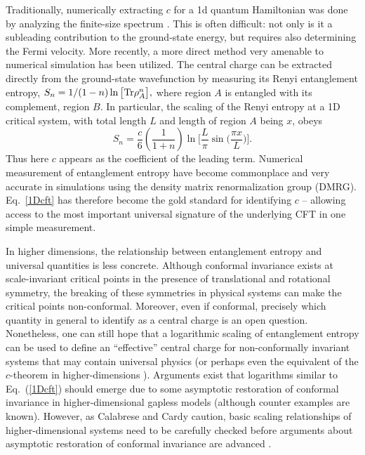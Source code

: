 \documentclass[prl,aps,twocolumn,floatfix,amsmath,amssymb,superscriptaddress,tightenlines]{revtex4}
\begin{document}
Traditionally, numerically extracting $c$ for a 1d quantum
Hamiltonian was done by analyzing the finite-size spectrum
\cite{BCN,Affleck}.  This is often difficult: not only is it a
subleading contribution to the ground-state energy, but requires also
determining the Fermi velocity.
More recently, a more direct method very amenable to numerical
simulation has been utilized.  The central charge can be extracted
directly from the ground-state wavefunction by measuring its Renyi
entanglement entropy, $ S_n = 1/(1-n) \ln \big[ {\rm Tr} \rho_A^n
\big], $ where region $A$ is entangled with its complement, region
$B$.  In particular, the scaling of the Renyi entropy at a 1D critical system,
with total length $L$ and length of region $A$ being $x$, obeys \cite{Korepin,Cardy}
\begin{equation}
S_n = \frac{c}{6}\left({ \frac{1}{1+n} }\right) \ln\Big[ \frac{L}{\pi} \sin\big( \frac{\pi x}{L} \big) \Big]. \label{1Dcft}
\end{equation}
Thus here $c$ appears as the coefficient of the leading
term.  
Numerical measurement of entanglement entropy have become commonplace and 
very accurate in simulations using the density matrix renormalization group (DMRG).
Eq.~\ref{1Dcft} has therefore become the gold standard for identifying
$c$ -- allowing access to the most important universal signature of
the underlying CFT in one simple measurement.



In higher dimensions, the relationship between entanglement entropy
and universal quantities is less concrete.  Although conformal
invariance exists at scale-invariant critical points in the presence
of translational and rotational symmetry, the breaking of these
symmetries in physical systems can make the critical points
non-conformal.  Moreover, even if conformal, precisely which quantity
in general to identify as a central charge is an open question.
Nonetheless, one can still hope that a logarithmic scaling of
entanglement entropy can be used to define an ``effective'' central
charge for non-conformally invariant systems that may contain
universal physics (or perhaps even the equivalent of the $c$-theorem
in higher-dimensions \cite{ryu,Myers}).  Arguments exist that
logarithms similar to Eq.~(\ref{1Dcft}) should emerge due to some
asymptotic restoration of conformal invariance in higher-dimensional
gapless models \cite{Shredder} (although counter examples are known).  However, as
Calabrese and Cardy caution, basic scaling relationships of
higher-dimensional systems need to be carefully checked before
arguments about asymptotic restoration of conformal invariance are
advanced \cite{EE_CFT}.
\end{document}
